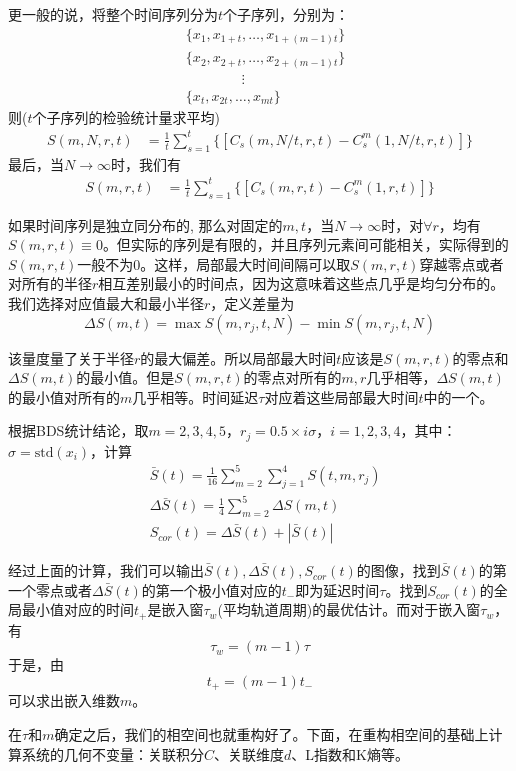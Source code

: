             更一般的说，将整个时间序列分为$t$个子序列，分别为：
            \begin{align*}
                & \{x_1,x_{1+t},\dots,x_{1+(m-1)t}\} \\
                & \{x_2,x_{2+t},\dots,x_{2+(m-1)t}\} \\
                & \qquad \qquad \vdots \\
                & \{x_t,x_{2t},\dots,x_{mt}\}
            \end{align*}
            则($t$个子序列的检验统计量求平均)
            \begin{align*}
                S(m,N,r,t) &= \frac{1}{t} \sum_{s = 1}^t \{[C_s(m,N/t,r,t) - C_s^m(1,N/t,r,t)] \}
            \end{align*}
            最后，当$N\rightarrow \infty$时，我们有
            \begin{align*}
                S(m,r,t) &= \frac{1}{t} \sum_{s = 1}^t \{[C_s(m,r,t) - C_s^m(1,r,t)] \}
            \end{align*}
            \par
            如果时间序列是独立同分布的, 那么对固定的$m,t$，当$N\rightarrow \infty$时，对$\forall r$，均有$S(m,r,t) \equiv 0$。但实际的序列是有限的，并且序列元素间可能相关，实际得到的$S(m,r,t)$一般不为0。这样，局部最大时间间隔可以取$S(m,r,t)$穿越零点或者对所有的半径$r$相互差别最小的时间点，因为这意味着这些点几乎是均匀分布的。我们选择对应值最大和最小半径$r$，定义差量为
            \[
                \Delta S(m,t) = \max{S(m,r_j,t,N)} - \min{S(m,r_j,t,N)}
            \]
            \par
            该量度量了关于半径$ r $的最大偏差。所以局部最大时间$ t $应该是$S(m ,r,t) $的零点和$\Delta S( m ,t ) $的最小值。但是$S(m ,r,t) $的零点对所有的$m,r$几乎相等，$\Delta S( m ,t ) $的最小值对所有的$ m $几乎相等。时间延迟$\tau$对应着这些局部最大时间$ t $中的一个。
            \par
            根据BDS统计结论，取$m = 2,3,4,5$，$r_j = 0.5 \times i \sigma$，$i= 1,2,3,4$，其中：$\sigma = \mathrm{std}(x_i)$，计算
            \begin{align*}
                &\bar{S}(t) = \frac{1}{16} \sum_{m = 2}^5 \sum_{j = 1}^4 S(t,m,r_j)\\
                &\Delta \bar{S}(t) = \frac{1}{4} \sum_{m = 2}^5 \Delta S(m,t)\\
                &S_{cor}(t) = \Delta \bar{S}(t) + |\bar{S}(t)|
            \end{align*}
            \par
            经过上面的计算，我们可以输出$\bar{S}(t),\Delta \bar{S}(t),S_{cor}(t)$的图像，找到$\bar{S}(t)$的第一个零点或者$\Delta \bar{S}(t)$的第一个极小值对应的$t_-$即为延迟时间$\tau$。找到$S_{cor}(t)$的全局最小值对应的时间$t_+$是嵌入窗$\tau_w$(平均轨道周期)的最优估计。而对于嵌入窗$\tau_w$，有
            \[
                \tau _w = (m - 1)\tau
            \]
            于是，由
            \[
                t_+ = (m - 1)t_-
            \]
            可以求出嵌入维数$m$。
            \par
            在$\tau$和$m$确定之后，我们的相空间也就重构好了。下面，在重构相空间的基础上计算系统的几何不变量：关联积分$C$、关联维度$d$、L指数和K熵等。

